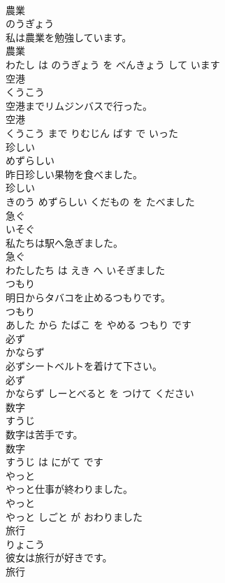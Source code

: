 \documentclass[8pt]{extreport}
\begin{document}
\begin{CJK}{UTF8}{min}
\\	農業	
\\	のうぎょう			
\\	私は農業を勉強しています。	
\\	農業 
\\	わたし は のうぎょう を べんきょう して います			
\\	空港	
\\	くうこう			
\\	空港までリムジンバスで行った。	
\\	空港 
\\	くうこう まで りむじん ばす で いった			
\\	珍しい	
\\	めずらしい			
\\	昨日珍しい果物を食べました。	
\\	珍しい 
\\	きのう めずらしい くだもの を たべました			
\\	急ぐ	
\\	いそぐ			
\\	私たちは駅へ急ぎました。	
\\	急ぐ 
\\	わたしたち は えき へ いそぎました			
\\	つもり	
\\	明日からタバコを止めるつもりです。	
\\	つもり 
\\	あした から たばこ を やめる つもり です			
\\	必ず	
\\	かならず			
\\	必ずシートベルトを着けて下さい。	
\\	必ず 
\\	かならず しーとべると を つけて ください			
\\	数字	
\\	すうじ			
\\	数字は苦手です。	
\\	数字 
\\	すうじ は にがて です			
\\	やっと	
\\	やっと仕事が終わりました。	
\\	やっと 
\\	やっと しごと が おわりました			
\\	旅行	
\\	りょこう			
\\	彼女は旅行が好きです。	
\\	旅行 

\end{CJK}
\end{document}
